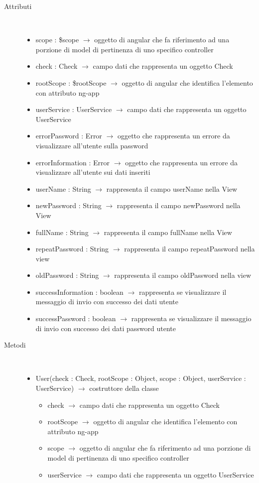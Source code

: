 \begin{description}
\item[Attributi] \hfill \\
\vspace{-7mm}
\begin{itemize}
	\item scope : \$scope $\rightarrow$ oggetto di angular che fa riferimento ad una porzione di model di pertinenza di uno specifico controller
	\item check : Check $\rightarrow$ campo dati che rappresenta un oggetto Check
	\item rootScope : \$rootScope $\rightarrow$ oggetto di angular che identifica l’elemento con attributo ng-app
	\item userService : UserService $\rightarrow$ campo dati che rappresenta un oggetto UserService
	\item errorPassword : Error $\rightarrow$ oggetto che rappresenta un errore da visualizzare all'utente sulla password
	\item errorInformation : Error $\rightarrow$ oggetto che rappresenta un errore da visualizzare all'utente sui dati inseriti
	\item userName : String $\rightarrow$ rappresenta il campo userName nella View
	\item newPassword : String $\rightarrow$ rappresenta il campo newPassword nella View	
	\item fullName : String $\rightarrow$ rappresenta il campo fullName nella View
	\item repeatPassword : String $\rightarrow$ rappresenta il campo repeatPassword nella view	
	\item oldPassword : String $\rightarrow$ rappresenta il campo oldPassword nella view
	\item successInformation : boolean $\rightarrow$ rappresenta se visualizzare il messaggio di invio con successo dei dati utente
	\item successPassword : boolean $\rightarrow$ rappresenta se visualizzare il messaggio di invio con successo dei dati password utente
\end{itemize}

\item[Metodi] \hfill \\
\vspace{-7mm}
\begin{itemize}
	\item User(check : Check, rootScope : Object, scope : Object, userService : UserService) $\rightarrow$ costruttore della classe\begin{itemize}
		\item check $\rightarrow$ campo dati che rappresenta un oggetto Check
		\item rootScope $\rightarrow$ oggetto di angular che identifica l’elemento con attributo ng-app
		\item scope $\rightarrow$ oggetto di angular che fa riferimento ad una porzione di model di pertinenza di uno specifico controller
		\item userService $\rightarrow$ campo dati che rappresenta un oggetto UserService
	\end{itemize}
	

\end{itemize}
\end{description}
